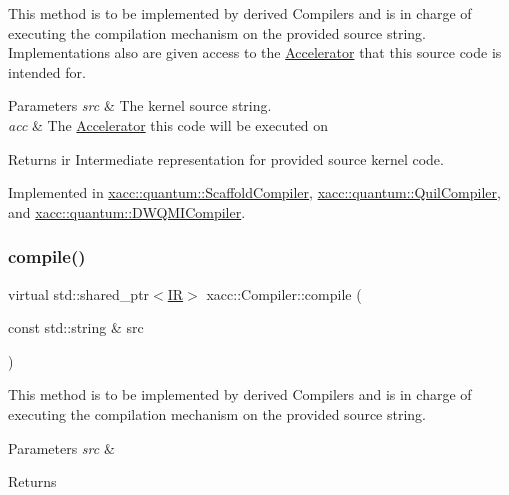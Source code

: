 This method is to be implemented by derived Compilers and is in charge of executing the compilation mechanism on the provided source string. Implementations also are given access to the \hyperlink{a01613}{Accelerator} that this source code is intended for.


\begin{DoxyParams}{Parameters}
{\em src} & The kernel source string. \\
\hline
{\em acc} & The \hyperlink{a01613}{Accelerator} this code will be executed on \\
\hline
\end{DoxyParams}
\begin{DoxyReturn}{Returns}
ir Intermediate representation for provided source kernel code. 
\end{DoxyReturn}


Implemented in \hyperlink{a01177_a7caede75bb2304ba405966651b115543}{xacc\+::quantum\+::\+Scaffold\+Compiler}, \hyperlink{a01157_a2421482415ca4e09963ea4ecddff8100}{xacc\+::quantum\+::\+Quil\+Compiler}, and \hyperlink{a01137_a0df05642f1a6fd44ce7f1c0396d50c9c}{xacc\+::quantum\+::\+D\+W\+Q\+M\+I\+Compiler}.

\mbox{\label{a01629_a9092f5f779b570c91569b59621280c04}} 
\subsubsection{\texorpdfstring{compile()}{compile()}\hspace{0.1cm}{\footnotesize\ttfamily [2/2]}}
{\footnotesize\ttfamily virtual std\+::shared\+\_\+ptr$<$\hyperlink{a01677}{IR}$>$ xacc\+::\+Compiler\+::compile (\begin{DoxyParamCaption}\item[{const std\+::string \&}]{src }\end{DoxyParamCaption})\hspace{0.3cm}{\ttfamily [pure virtual]}}

This method is to be implemented by derived Compilers and is in charge of executing the compilation mechanism on the provided source string. 
\begin{DoxyParams}{Parameters}
{\em src} & \\
\hline
\end{DoxyParams}
\begin{DoxyReturn}{Returns}

\end{DoxyReturn}


